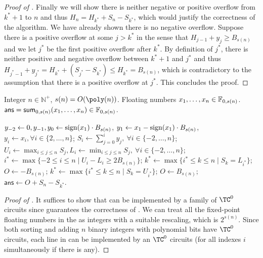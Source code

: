 \begin{proof}[Proof of ]
Finally we will show there is neither negative or positive overflow from $k^*+1$ to $n$ and thus $H_n = H_{k^*} + S_n-S_{k^*}$, which would justify the correctness of the algorithm. We have already shown there is no negative overflow. Suppose there is a positive overflow at some $j>k^*$ in the sense that $H_{j-1}+y_j\ge B_{s(n)}$ and we let $j^*$ be the first positive overflow after $k^*$. By definition of $j^*$, there is neither positive and negative overflow between $k^*+1$ and $j^*$ and thus $H_{j^*-1}+y_{j^*} = H_{k^*} + (S_{j^*} - S_{k^*})\le H_{k^*}=B_{s(n)}$, which is contradictory to the assumption that there is a positive overflow at $j^*$. This concludes the proof. 
\end{proof}


	
\begin{algorithm}
\caption{$\AC^0$ algorithm for iterative addition for poly-precision floating point numbers}\label{alg:gridworld}
\begin{algorithmic}[1]

\Require Integer $n\in\mathbb{N}^+$, $s(n)=O(\poly(n))$. Floating numbers $x_1,\ldots, x_n\in \mathbb{F}_{0,s(n)}$.
\Ensure $\mathsf{ans} = \mathsf{sum}_{0,s(n)}(x_1,\ldots,x_n)\in\mathbb{F}_{0,s(n)}$.

\State   $y_{-2}\gets 0, y_{-1},y_{0} \gets \operatorname*{sign}(x_1) \cdot B_{s(n)}$, $y_1 \gets x_1 -\operatorname*{sign}(x_1) \cdot B_{s(n)}$, $y_i \gets x_i, \forall i\in\{2,\ldots,n\}$;
\State   $S_i\gets \sum_{j=0}^i y_j,\ \forall i\in\{-2,\ldots,n\}$;
\State   $U_i \gets \max_{i\le j\le n} S_j, L_i \gets \min_{i\le j\le n} S_j,\ \forall i\in\{-2,\ldots, n\}$;
\State $i^*  \gets \max \{-2\le i\le n\mid U_i-L_i\ge 2B_{s(n)}\}$;
\State   $k^*  \gets \max\{i^*\le k\le n\mid S_{k} = L_{i^*}\}$;
\State   $O  \gets -B_{s(n)}$;
\Else
\State   $k^*  \gets \max\{i^*\le k\le n\mid S_{k} = U_{i^*}\}$;
\State   $O  \gets B_{s(n)}$;
\EndIf
\State $\mathsf{ans}\gets O + S_{n} -  S_{k^*}$.
\end{algorithmic}
\end{algorithm}

\begin{proof}[Proof of ]
It suffices to show that  can be implemented by a family of $\TC^0$ circuits since  guarantees the correctness of . We can treat all the fixed-point floating numbers in the  as integers with a suitable rescaling, which is $2^{s(n)}$. Since both sorting and adding $n$ binary integers with polynomial bits have $\TC^0$ circuits, each line in  can be implemented by an $\TC^0$ circuits (for all indexes $i$ simultaneously if there is any).
\end{proof}
	 
